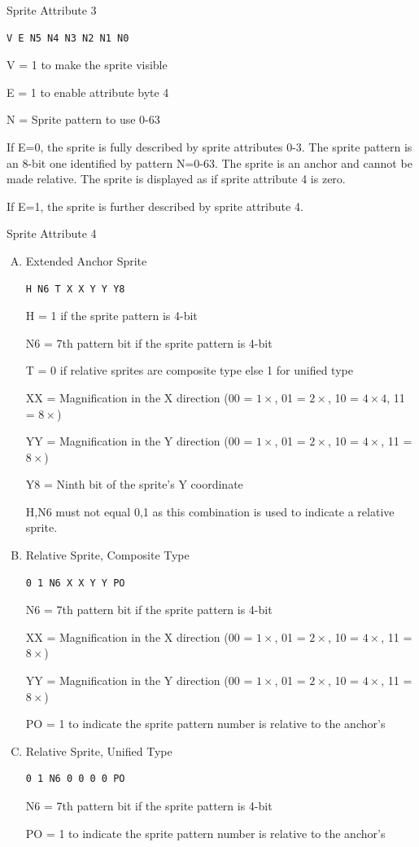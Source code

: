 Sprite Attribute 3
\begin{verbatim}
V E N5 N4 N3 N2 N1 N0
\end{verbatim}
V = 1 to make the sprite visible

E = 1 to enable attribute byte 4

N = Sprite pattern to use 0-63

If E=0, the sprite is fully described by sprite attributes 0-3. The
sprite pattern is an 8-bit one identified by pattern N=0-63. The
sprite is an anchor and cannot be made relative. The sprite is
displayed as if sprite attribute 4 is zero.

If E=1, the sprite is further described by sprite attribute 4.

Sprite Attribute 4
\begin{enumerate}[A.]
\item Extended Anchor Sprite
\begin{verbatim}
H N6 T X X Y Y Y8
\end{verbatim}
H = 1 if the sprite pattern is 4-bit

N6 = 7th pattern bit if the sprite pattern is 4-bit

T = 0 if relative sprites are composite type else 1 for unified type

XX = Magnification in the X direction (00 = $1\times$, 01 = $2\times$,
10 = $4\times4$, 11 = $8\times$)

YY = Magnification in the Y direction (00 = $1\times$, 01 = $2\times$,
10 = $4\times$, 11 = $8\times$)

Y8 = Ninth bit of the sprite’s Y coordinate

{H,N6} must not equal {0,1} as this combination is used to indicate a
relative sprite.

\item Relative Sprite, Composite Type
\begin{verbatim}
0 1 N6 X X Y Y PO
\end{verbatim}
N6 = 7th pattern bit if the sprite pattern is 4-bit

XX = Magnification in the X direction (00 = $1\times$, 01 = $2\times$,
10 = $4\times$, 11 = $8\times$)

YY = Magnification in the Y direction (00 = $1\times$, 01 = $2\times$,
10 = $4\times$, 11 = $8\times$)

PO = 1 to indicate the sprite pattern number is relative to the
anchor’s

\item Relative Sprite, Unified Type
\begin{verbatim}
0 1 N6 0 0 0 0 PO
\end{verbatim}
N6 = 7th pattern bit if the sprite pattern is 4-bit

PO = 1 to indicate the sprite pattern number is relative to the
anchor’s
\end{enumerate}
